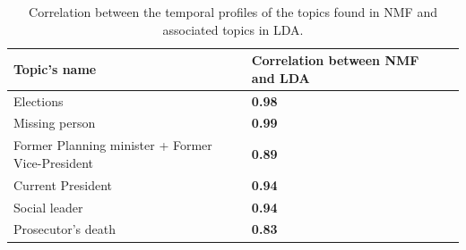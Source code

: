 \documentclass{bmcart}
\begin{document}
\begin{backmatter}
\begin{table}[h!]
\caption{Correlation between the temporal profiles of the topics found in NMF and associated topics in LDA.}
\begin{tabular}{llc}
Topic's name & Correlation between NMF and LDA \\ \hline
Elections & \textbf{0.98} \\
Missing person & \textbf{0.99} \\
Former Planning minister + Former Vice-President & \textbf{0.89} \\
Current President & \textbf{0.94} \\
Social leader & \textbf{0.94} \\
Prosecutor's death & \textbf{0.83} \\
\end{tabular}
\label{table:correlation_nmf_lda}
\end{table}






\end{backmatter}
\end{document}
